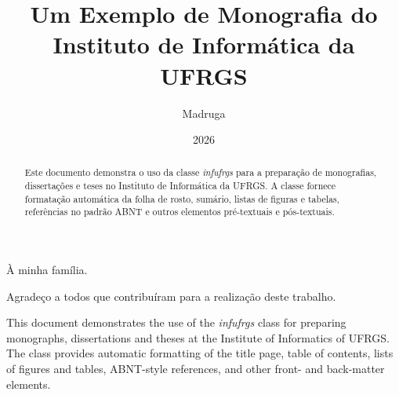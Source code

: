 \documentclass[ppgc,diss,english]{infufrgs}
\title{Um Exemplo de Monografia do Instituto de Informática da UFRGS}
\author{Madruga}{Rodrigo Dalto\'e}
\date{2026}
\begin{document}

\maketitle

\begin{dedicatoria}
  À minha família.
\end{dedicatoria}

\begin{agradecimentos}
  Agradeço a todos que contribuíram para a realização deste trabalho.
\end{agradecimentos}

\begin{abstract}
  Este documento demonstra o uso da classe \textit{infufrgs} para a preparação
  de monografias, dissertações e teses no Instituto de Informática da UFRGS.
  A classe fornece formatação automática da folha de rosto, sumário, listas de
  figuras e tabelas, referências no padrão ABNT e outros elementos
  pré-textuais e pós-textuais.
\end{abstract}

\begin{translatedabstract}
  This document demonstrates the use of the \textit{infufrgs} class for
  preparing monographs, dissertations and theses at the Institute of
  Informatics of UFRGS.  The class provides automatic formatting of the
  title page, table of contents, lists of figures and tables, ABNT-style
  references, and other front- and back-matter elements.
\end{translatedabstract}

\tableofcontents
\end{document}

